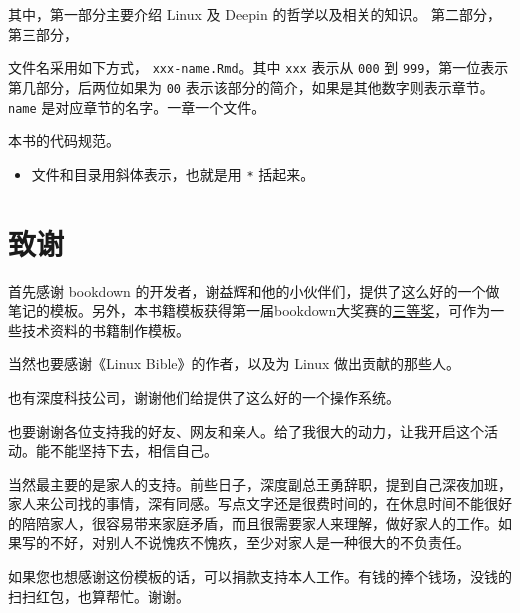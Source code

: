 \documentclass[doctor,openright,twoside]{sjtuthesis}
\providecommand{\tightlist}{%
    \setlength{\itemsep}{0pt}\setlength{\parskip}{0pt}}
\newcommand{\passthrough}[1]{#1}
\theoremstyle{plain}
\theoremstyle{definition}
\theoremstyle{remark}
\theoremstyle{ocrenumbox}
\theoremstyle{plain}
\begin{document}
其中，第一部分主要介绍 Linux 及 Deepin 的哲学以及相关的知识。
第二部分，第三部分，

文件名采用如下方式， \passthrough{\lstinline!xxx-name.Rmd!}。其中
\passthrough{\lstinline!xxx!} 表示从 \passthrough{\lstinline!000!} 到
\passthrough{\lstinline!999!}，第一位表示第几部分，后两位如果为
\passthrough{\lstinline!00!}
表示该部分的简介，如果是其他数字则表示章节。\passthrough{\lstinline!name!}
是对应章节的名字。一章一个文件。

本书的代码规范。

\begin{itemize}
\tightlist
\item
  文件和目录用斜体表示，也就是用 \passthrough{\lstinline!*!} 括起来。
\end{itemize}



\chapter{致谢}

首先感谢 bookdown
的开发者，谢益辉和他的小伙伴们，提供了这么好的一个做笔记的模板。另外，本书籍模板获得第一届bookdown大奖赛的\href{https://community.rstudio.com/t/announcing-winners-of-the-1st-bookdown-contest/16394}{三等奖}，可作为一些技术资料的书籍制作模板。

当然也要感谢《Linux Bible》的作者，以及为 Linux 做出贡献的那些人。

也有深度科技公司，谢谢他们给提供了这么好的一个操作系统。

也要谢谢各位支持我的好友、网友和亲人。给了我很大的动力，让我开启这个活动。能不能坚持下去，相信自己。

当然最主要的是家人的支持。前些日子，深度副总王勇辞职，提到自己深夜加班，家人来公司找的事情，深有同感。写点文字还是很费时间的，在休息时间不能很好的陪陪家人，很容易带来家庭矛盾，而且很需要家人来理解，做好家人的工作。如果写的不好，对别人不说愧疚不愧疚，至少对家人是一种很大的不负责任。

如果您也想感谢这份模板的话，可以捐款支持本人工作。有钱的捧个钱场，没钱的扫扫红包，也算帮忙。谢谢。
\end{document}
